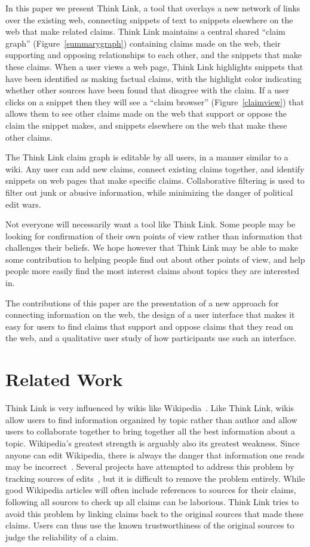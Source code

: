 \documentclass{chi2009}
\begin{document}
In this paper we present Think Link, a tool that overlays a new network of links over the existing web, connecting snippets of text to snippets elsewhere on the web that make related claims. Think Link maintains a central shared ``claim graph'' (Figure~\ref{summarygraph}) containing claims made on the web, their supporting and opposing relationships to each other, and the snippets that make these claims. When a user views a web page, Think Link highlights snippets that have been identified as making factual claims, with the highlight color indicating whether other sources have been found that disagree with the claim. If a user clicks on a snippet then they will see a ``claim browser'' (Figure~\ref{claimview}) that allows them to see other claims made on the web that support or oppose the claim the snippet makes, and snippets elsewhere on the web that make these other claims. 

The Think Link claim graph is editable by all users, in a manner similar to a wiki. Any user can add new claims, connect existing claims together, and identify snippets on web pages that make specific claims. Collaborative filtering is used to filter out junk or abusive information, while minimizing the danger of political edit wars.

Not everyone will necessarily want a tool like Think Link. Some people may be looking for confirmation of their own points of view rather than information that challenges their beliefs. We hope however that Think Link may be able to make some contribution to helping people find out about other points of view, and help people more easily find the most interest claims about topics they are interested in.

The contributions of this paper are the presentation of a new approach for connecting information on the web, the design of a user interface that makes it easy for users to find claims that support and oppose claims that they read on the web, and a qualitative user study of how participants use such an interface.


\section{Related Work}

Think Link is very influenced by wikis like Wikipedia~\cite{wikipedia}. Like Think Link, wikis allow users to find information organized by topic rather than author and allow users to collaborate together to bring together all the best information about a topic. Wikipedia's greatest strength is arguably also its greatest weakness. Since anyone can edit Wikipedia, there is always the danger that information one reads may be incorrect~\cite{wikifalse}. Several projects have attempted to address this problem by tracking sources of edits~\cite{wikicorrect,wikicorrect2,wikicorrect3}, but it is difficult to remove the problem entirely. While good Wikipedia articles will often include references to sources for their claims, following all sources to check up all claims can be laborious. Think Link tries to avoid this problem by linking claims back to the original sources that made these claims. Users can thus use the known trustworthiness of the original sources to judge the reliability of a claim. 
\end{document}
